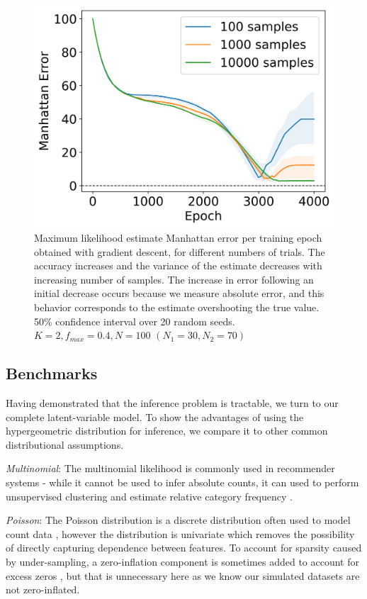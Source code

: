 \documentclass{article}
\theoremstyle{plain}
\theoremstyle{definition}
\theoremstyle{remark}
\begin{document}
\begin{figure}
    \centering
    \includegraphics[width=0.8\columnwidth]{sgd_k2_50ci.png}
     \caption{Maximum likelihood estimate Manhattan error per training epoch obtained with gradient descent, for different numbers of trials. The accuracy increases and the variance of the estimate decreases with increasing number of samples. The increase in error following an initial decrease occurs because we measure absolute error, and this behavior corresponds to the estimate overshooting the true value. 50\% confidence interval over 20 random seeds. $K=2, f_{max}=0.4, N=100$ $(N_1=30, N_2=70)$}
     \label{fig:sgd_k=2}
\end{figure}



\subsection{Benchmarks}
Having demonstrated that the inference problem is tractable, we turn to our complete latent-variable model. To show the advantages of using the hypergeometric distribution for inference, we compare it to other common distributional assumptions.

\textit{Multinomial}: The multinomial likelihood is commonly used in recommender systems - while it cannot be used to infer absolute counts, it can used to perform unsupervised clustering and estimate relative category frequency \cite{liang_variational_2018}.

\textit{Poisson}: The Poisson distribution is a discrete distribution often used to model count data \cite{inouye2017review}, however the distribution is univariate which removes the possibility of directly capturing dependence between features. To account for sparsity caused by under-sampling, a zero-inflation component is sometimes added to account for excess zeros \cite{lambert1992zero}, but that is unnecessary here as we know our simulated datasets are not zero-inflated.
\end{document}
